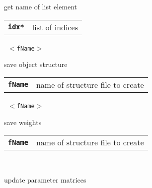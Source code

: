 \begin{description}
\begin{description}
        get name of list element

      \begin{tabular}{ll}
 \texttt{\textbf{idx*}} & list of indices \\
      \end{tabular}
       \texttt{ $<$fName$>$} \

        save object structure

      \begin{tabular}{ll}
 \texttt{\textbf{fName}} &  name of structure file to create  \\
      \end{tabular}
       \texttt{ $<$fName$>$} \

        save weights

      \begin{tabular}{ll}
 \texttt{\textbf{fName}} &  name of structure file to create  \\
      \end{tabular}
       \texttt{} \

        update parameter matrices

    \end{description}

\end{description}

